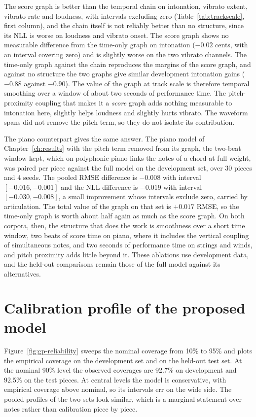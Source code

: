 \documentclass[11pt,a4paper]{report}
\newcommand{\covGP}{92.5\%}
\begin{document}
The score graph is better than
the temporal chain on intonation, vibrato extent, vibrato rate and
loudness, with intervals excluding zero (Table~\ref{tab:trackscale}, first
column), and the chain itself is not reliably better than no structure,
since its NLL is worse on loudness and vibrato onset. The score graph shows
no measurable difference from the time-only graph on intonation
($-0.02$ cents, with an interval covering zero) and is slightly worse on
the two vibrato channels. The time-only graph against the chain
reproduces the margins of the score graph, and against no structure the
two graphs give similar development intonation gains ($-0.88$ against
$-0.90$). The value of the graph at
track scale is therefore temporal smoothing over a window of about two
seconds of performance time. The pitch-proximity coupling that makes it a \emph{score} graph adds
nothing measurable to intonation here, slightly helps loudness and
slightly hurts vibrato. The waveform spans did not remove the pitch term,
so they do not isolate its contribution.

The piano counterpart gives the same answer. The piano model of
Chapter~\ref{ch:results} with the pitch term removed from its graph, the
two-beat window kept, which on polyphonic piano links the notes of a chord
at full weight, was paired per piece against the full model on the
development set, over $30$ pieces and $4$ seeds. The pooled RMSE difference
is $-0.008$ with interval $[-0.016, -0.001]$ and the NLL difference is
$-0.019$ with interval $[-0.030, -0.008]$, a small improvement whose
intervals exclude zero, carried by articulation. The total value of the
graph on that set is $+0.017$ RMSE, so the time-only graph is worth about
half again as much as the score graph. On both corpora, then, the structure
that does the work is smoothness over a short time window, two beats of
score time on piano, where it includes the vertical coupling of
simultaneous notes, and two seconds of performance time on strings and
winds, and pitch proximity adds little beyond it. These ablations use
development data, and the held-out comparisons remain those of the full
model against its alternatives.

\chapter{Calibration profile of the proposed model}\label{app:extra}
Figure~\ref{fig:gp-reliability} sweeps the nominal coverage from 10\% to
95\% and plots the empirical coverage on the development set and on the
held-out test set. At the nominal 90\% level the observed coverages are
92.7\% on development and \covGP{} on the test pieces. At central levels
the model is conservative, with empirical coverage above nominal, so its
intervals err on the wide side. The pooled profiles of the two sets look
similar, which is a marginal statement over notes rather than calibration
piece by piece.
\end{document}
